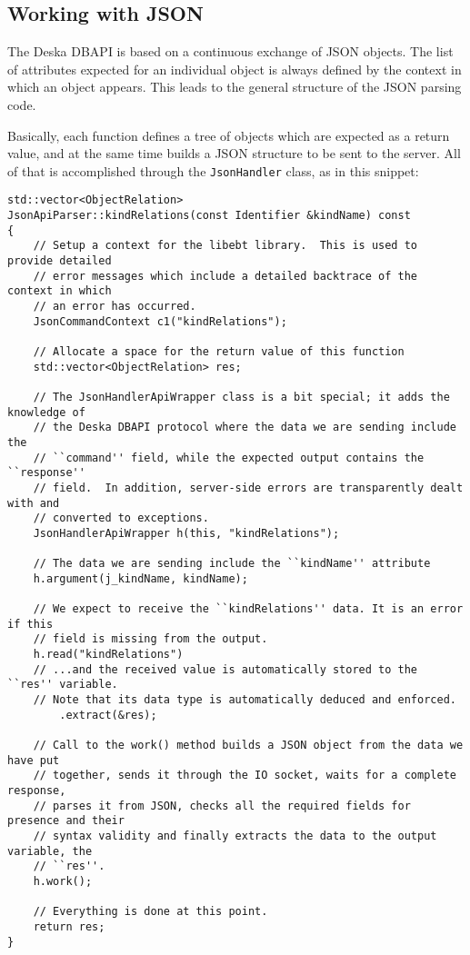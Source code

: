 \documentclass[deska]{subfiles}
\begin{document}
\subsection{Working with JSON}

The Deska DBAPI is based on a continuous exchange of JSON objects.  The list of attributes expected for an individual
object is always defined by the context in which an object appears.  This leads to the general structure of the JSON
parsing code.

Basically, each function defines a tree of objects which are expected as a return value, and at the same time builds a
JSON structure to be sent to the server.  All of that is accomplished through the {\tt JsonHandler} class, as in this
snippet:

\begin{verbatim}
std::vector<ObjectRelation>
JsonApiParser::kindRelations(const Identifier &kindName) const
{
    // Setup a context for the libebt library.  This is used to provide detailed
    // error messages which include a detailed backtrace of the context in which
    // an error has occurred.
    JsonCommandContext c1("kindRelations");

    // Allocate a space for the return value of this function
    std::vector<ObjectRelation> res;

    // The JsonHandlerApiWrapper class is a bit special; it adds the knowledge of
    // the Deska DBAPI protocol where the data we are sending include the
    // ``command'' field, while the expected output contains the ``response''
    // field.  In addition, server-side errors are transparently dealt with and
    // converted to exceptions.
    JsonHandlerApiWrapper h(this, "kindRelations");

    // The data we are sending include the ``kindName'' attribute
    h.argument(j_kindName, kindName);

    // We expect to receive the ``kindRelations'' data. It is an error if this
    // field is missing from the output.
    h.read("kindRelations")
    // ...and the received value is automatically stored to the ``res'' variable.
    // Note that its data type is automatically deduced and enforced.
        .extract(&res);

    // Call to the work() method builds a JSON object from the data we have put
    // together, sends it through the IO socket, waits for a complete response,
    // parses it from JSON, checks all the required fields for presence and their
    // syntax validity and finally extracts the data to the output variable, the
    // ``res''.
    h.work();

    // Everything is done at this point.
    return res;
}
\end{verbatim}
\end{document}
